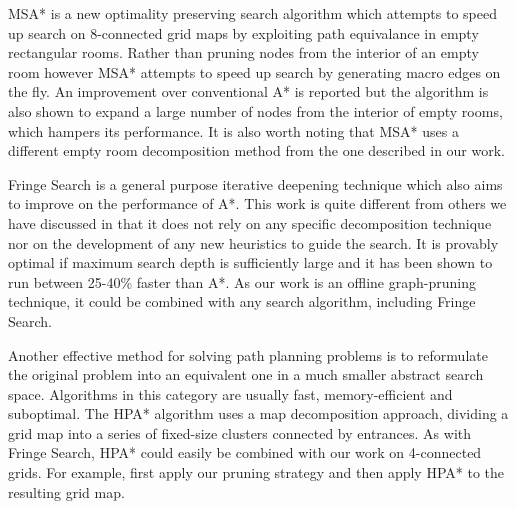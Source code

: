 \par
MSA* \cite{bolanca09} is a new optimality preserving search algorithm which attempts to speed up search 
on 8-connected grid maps by exploiting path equivalance in empty rectangular rooms. 
Rather than pruning nodes from the interior of an empty room however MSA* attempts to speed up 
search by generating macro edges on the fly.
An improvement over conventional A* is reported but the algorithm is also
shown to expand a large number of nodes from the interior of empty rooms, which hampers its performance.
It is also worth noting that MSA* uses a different empty room decomposition method
from the one described in our work.
\par
Fringe Search \cite{bjornsson05} is a general purpose iterative deepening technique which also
aims to improve on the performance of A*.
This work is quite different from others we have discussed in that it does not
rely on any specific decomposition technique nor on the development of any new heuristics
to guide the search.
It is provably optimal if maximum search depth is sufficiently large and 
it has been shown to run between 25-40\% faster than A*.
As our work is an offline graph-pruning technique, it could be combined with any search algorithm, including
Fringe Search.
\par
Another effective method for solving path planning problems is to reformulate the original problem
into an equivalent one in a much smaller abstract search space.
Algorithms in this category are usually fast, memory-efficient and suboptimal.
The HPA* algorithm \cite{botea04} uses a map decomposition approach,
dividing a grid map into a series of fixed-size clusters connected 
by entrances.
As with Fringe Search, HPA* could easily be combined with our work on 4-connected grids. For example, first apply our pruning strategy and then apply HPA* to the resulting grid map.
